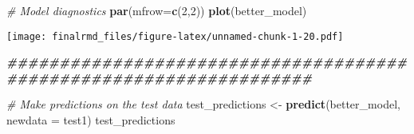 \documentclass[
]{article}
\newenvironment{Shaded}{\begin{snugshade}}{\end{snugshade}}
\newcommand{\AttributeTok}[1]{\textcolor[rgb]{0.13,0.29,0.53}{#1}}
\newcommand{\CommentTok}[1]{\textcolor[rgb]{0.56,0.35,0.01}{\textit{#1}}}
\newcommand{\DecValTok}[1]{\textcolor[rgb]{0.00,0.00,0.81}{#1}}
\newcommand{\DocumentationTok}[1]{\textcolor[rgb]{0.56,0.35,0.01}{\textbf{\textit{#1}}}}
\newcommand{\FunctionTok}[1]{\textcolor[rgb]{0.13,0.29,0.53}{\textbf{#1}}}
\newcommand{\NormalTok}[1]{#1}
\newcommand{\OtherTok}[1]{\textcolor[rgb]{0.56,0.35,0.01}{#1}}
\begin{document}
\begin{Shaded}
\begin{Highlighting}[]
\CommentTok{\# Model diagnostics}
\FunctionTok{par}\NormalTok{(}\AttributeTok{mfrow=}\FunctionTok{c}\NormalTok{(}\DecValTok{2}\NormalTok{,}\DecValTok{2}\NormalTok{))}
\FunctionTok{plot}\NormalTok{(better\_model)}
\end{Highlighting}
\end{Shaded}

\texttt{[image: finalrmd\_files/figure-latex/unnamed-chunk-1-20.pdf]}

\begin{Shaded}
\begin{Highlighting}[]
\DocumentationTok{\#\#\#\#\#\#\#\#\#\#\#\#\#\#\#\#\#\#\#\#\#\#\#\#\#\#\#\#\#\#\#\#\#\#\#\#\#\#\#\#\#\#\#\#\#\#\#\#\#\#\#\#\#\#\#\#\#\#\#\#\#\#\#\#\#\#\#}

\CommentTok{\# Make predictions on the test data}
\NormalTok{test\_predictions }\OtherTok{\textless{}{-}} \FunctionTok{predict}\NormalTok{(better\_model, }\AttributeTok{newdata =}\NormalTok{ test1)}
\NormalTok{test\_predictions}
\end{Highlighting}
\end{Shaded}
\end{document}
